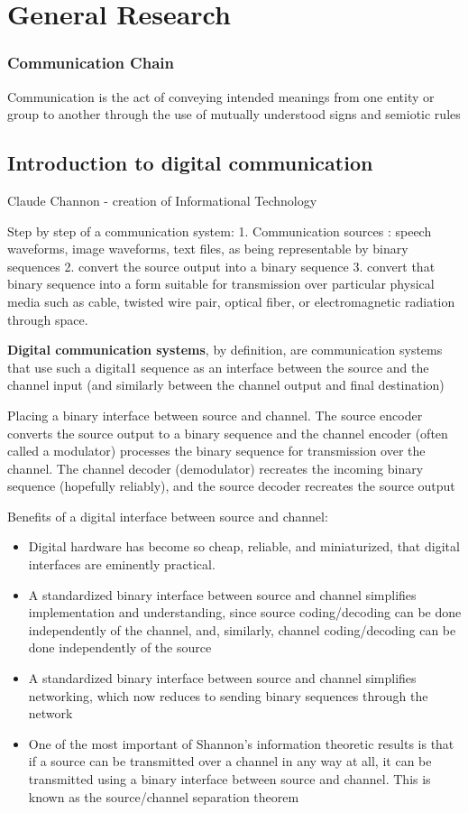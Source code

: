 \documentclass[12pt,a4paper]{report}
\begin{document}
\section{General Research}
\subsubsection{Communication Chain}


Communication is the act of conveying intended meanings from one entity or group to another through the use of mutually understood signs and semiotic rules

\subsection{Introduction to digital communication}

Claude Channon - creation of Informational Technology

Step by step of a communication system: 
	1. Communication sources  : speech waveforms,
image waveforms, text files, as being representable by binary sequences
	2. convert the source output into a binary sequence
	3. convert that binary sequence into a form suitable for transmission over particular physical media
such as cable, twisted wire pair, optical fiber, or electromagnetic radiation through space.

	\textbf{Digital communication systems}, by definition, are communication systems that use such a digital1
sequence as an interface between the source and the channel input (and similarly between the
channel output and final destination) 

Placing a binary interface between source and channel. The source encoder converts the source output to a binary sequence and the channel encoder (often
called a modulator) processes the binary sequence for transmission over the channel.
The channel decoder (demodulator) recreates the incoming binary sequence (hopefully
reliably), and the source decoder recreates the source output

Benefits of a digital interface between source and channel:
\begin{itemize}
\item Digital hardware has become so cheap, reliable, and miniaturized, that digital interfaces are
eminently practical.
\item A standardized binary interface between source and channel simplifies implementation and
understanding, since source coding/decoding can be done independently of the channel,
and, similarly, channel coding/decoding can be done independently of the source
\item A standardized binary interface between source and channel simplifies networking, which
now reduces to sending binary sequences through the network
\item One of the most important of Shannon’s information theoretic results is that if a source
can be transmitted over a channel in any way at all, it can be transmitted using a binary
interface between source and channel. This is known as the source/channel separation
theorem
\end{itemize}
\end{document}
